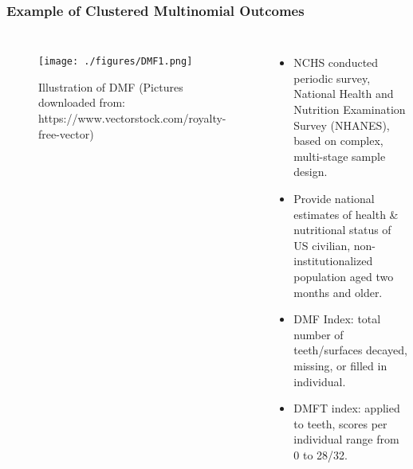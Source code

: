 \documentclass[hyperref={bookmarks=false},aspectratio=169]{beamer}
\begin{document}
\begin{frame}
\frametitle{Example of Clustered Multinomial Outcomes}

\begin{columns}


\begin{figure}
    \centering
    \texttt{[image: ./figures/DMF1.png]}
    \caption{Illustration of DMF \newline \tiny{(Pictures downloaded from: https://www.vectorstock.com/royalty-free-vector)}}
    \label{fig:toothDMF}
\end{figure}

\begin{itemize}
    \item NCHS conducted periodic survey, National Health and Nutrition Examination Survey (NHANES), based on complex, multi-stage sample design.
    \item Provide national estimates of health {\&} nutritional status of US civilian, non-institutionalized population aged two months and older.
    \item DMF Index: total number of teeth/surfaces decayed, missing, or filled in individual.
    \item DMFT index: applied to teeth, scores per individual range from 0 to 28/32.
\end{itemize}

\end{columns}
\end{frame}
\end{document}
